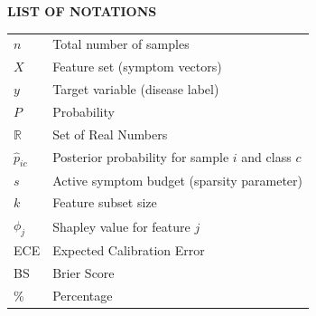 \documentclass[reqno,12pt,oneside]{report} %
\theoremstyle{plain}
\theoremstyle{definition}
\theoremstyle{remark}
\numberwithin{theorem}{chapter}
\begin{document}





\initializefrontsections
\setcounter{page}{1}

\startdeclarationpage

\label{declaration}

% 

\startacknowledgementspage

\label{Acknowledgements}

\startabstractpage

\label{Abstract}

\listofnotations
\begin{center}
  {\large\bf LIST OF NOTATIONS}
\end{center}
\vspace{0.4in}

\begin{tabular}{p{2.5cm}p{10cm}}
$n$              & Total number of samples \\
$X$              & Feature set (symptom vectors) \\
$y$              & Target variable (disease label) \\
$P$              & Probability \\
$\mathbb{R}$     & Set of Real Numbers \\
$\hat{p}_{ic}$   & Posterior probability for sample $i$ and class $c$ \\
$s$              & Active symptom budget (sparsity parameter) \\
$k$              & Feature subset size \\
$\phi_j$         & Shapley value for feature $j$ \\
ECE              & Expected Calibration Error \\
BS               & Brier Score \\
\%               & Percentage \\
\end{tabular}
\end{document}

